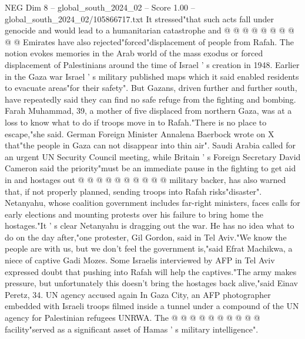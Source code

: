 \begin{textsample}{NEG Dim 8 – global\_south\_2024\_02 – Score 1.00 – global\_south\_2024\_02/105866717.txt}
It stressed"that such acts fall under genocide and would lead to a humanitarian catastrophe and @ @ @ @ @ @ @ @ @ @ Emirates have also rejected"forced"displacement of people from Rafah.
The notion evokes memories in the Arab world of the mass exodus or forced displacement of Palestinians around the time of Israel ' s creation in 1948.
Earlier in the Gaza war Israel ' s military published maps which it said enabled residents to evacuate areas"for their safety".
But Gazans, driven further and further south, have repeatedly said they can find no safe refuge from the fighting and bombing.
Farah Muhammad, 39, a mother of five displaced from northern Gaza, was at a loss to know what to do if troops move in to Rafah."There is no place to escape,"she said.
German Foreign Minister Annalena Baerbock wrote on X that"the people in Gaza can not disappear into thin air".
Saudi Arabia called for an urgent UN Security Council meeting, while Britain ' s Foreign Secretary David Cameron said the priority"must be an immediate pause in the fighting to get aid in and hostages out @ @ @ @ @ @ @ @ @ @ military backer, has also warned that, if not properly planned, sending troops into Rafah risks"disaster".
Netanyahu, whose coalition government includes far-right ministers, faces calls for early elections and mounting protests over his failure to bring home the hostages."It ' s clear Netanyahu is dragging out the war.
He has no idea what to do on the day after,"one protester, Gil Gordon, said in Tel Aviv."We know the people are with us, but we don't feel the government is,"said Efrat Machikwa, a niece of captive Gadi Mozes.
Some Israelis interviewed by AFP in Tel Aviv expressed doubt that pushing into Rafah will help the captives."The army makes pressure, but unfortunately this doesn't bring the hostages back alive,"said Einav Peretz, 34.
UN agency accused again In Gaza City, an AFP photographer embedded with Israeli troops filmed inside a tunnel under a compound of the UN agency for Palestinian refugees UNRWA.
The @ @ @ @ @ @ @ @ @ @ facility"served as a significant asset of Hamas ' s military intelligence".

\end{textsample}
